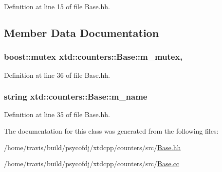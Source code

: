 Definition at line 15 of file Base.\-hh.



\subsection{Member Data Documentation}
\hypertarget{classxtd_1_1counters_1_1Base_aeeac2ffcae02eb6341418d708188a353}{
\subsubsection[{m\-\_\-mutex}]{\setlength{\rightskip}{0pt plus 5cm}boost\-::mutex xtd\-::counters\-::\-Base\-::m\-\_\-mutex\hspace{0.3cm}{\ttfamily [mutable]}, {\ttfamily [protected]}}}\label{classxtd_1_1counters_1_1Base_aeeac2ffcae02eb6341418d708188a353}


Definition at line 36 of file Base.\-hh.

\hypertarget{classxtd_1_1counters_1_1Base_ab07d4a6071bfa8263b24d5992bca6960}{
\subsubsection[{m\-\_\-name}]{\setlength{\rightskip}{0pt plus 5cm}string xtd\-::counters\-::\-Base\-::m\-\_\-name\hspace{0.3cm}{\ttfamily [protected]}}}\label{classxtd_1_1counters_1_1Base_ab07d4a6071bfa8263b24d5992bca6960}


Definition at line 35 of file Base.\-hh.



The documentation for this class was generated from the following files\-:\begin{DoxyCompactItemize}
\item 
/home/travis/build/psycofdj/xtdcpp/counters/src/\hyperlink{Base_8hh}{Base.\-hh}\item 
/home/travis/build/psycofdj/xtdcpp/counters/src/\hyperlink{Base_8cc}{Base.\-cc}\end{DoxyCompactItemize}
